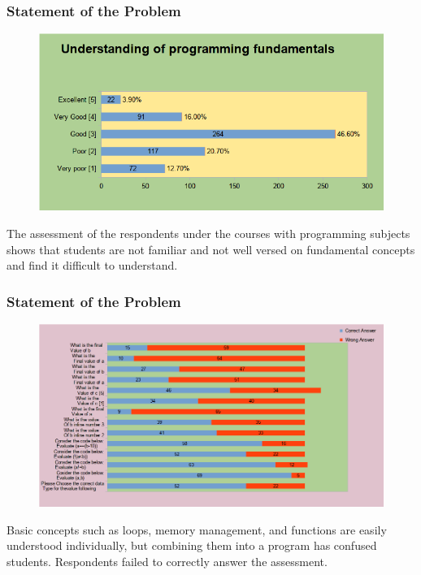 \documentclass[handout]{beamer}
\newcommand{\parx}{
	\setlength{\parindent}{4em}
	\par}
\begin{document}
\begin{frame}
	\frametitle{Statement of the Problem}
	\begin{figure}
		\includegraphics[scale=0.25]{results/12.png}
	\end{figure}

	\justifying
	\parx
	The assessment of the respondents under the courses with programming subjects
	shows that students are not familiar and not well versed on fundamental
	concepts and find it difficult to understand.
\end{frame}

\begin{frame}
	\frametitle{Statement of the Problem}
	\begin{figure}
		\includegraphics[scale=0.25]{results/13.png}
	\end{figure}

	\justifying
	\parx
	Basic concepts such as loops, memory management, and functions are easily
	understood individually, but combining them into a program has confused
	students. Respondents failed to correctly answer the assessment.
\end{frame}
\end{document}

